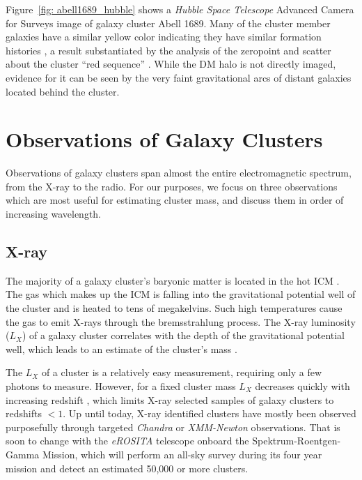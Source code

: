 Figure~\ref{fig: abell1689_hubble} shows a \emph{Hubble Space Telescope} Advanced Camera for Surveys image of galaxy cluster Abell 1689. Many of the cluster member galaxies have a similar yellow color indicating they have similar formation histories , a result substantiated by the analysis of the zeropoint and scatter about the cluster ``red sequence'' . While the DM halo is not directly imaged, evidence for it can be seen by the very faint gravitational arcs of distant galaxies located behind the cluster.

\section{Observations of Galaxy Clusters}
Observations of galaxy clusters span almost the entire electromagnetic spectrum, from the X-ray to the radio. For our purposes, we focus on three observations which are most useful for estimating cluster mass, and discuss them in order of increasing wavelength.

\subsection{X-ray}
The majority of a galaxy cluster's baryonic matter is located in the hot ICM \citep{Voit2005}. The gas which makes up the ICM is falling into the gravitational potential well of the cluster and is heated to tens of megakelvins. Such high temperatures cause the gas to emit X-rays through the bremsstrahlung process. The X-ray luminosity ($L_X$) of a galaxy cluster correlates with the depth of the gravitational potential well, which leads to an estimate of the cluster's mass . 

The $L_X$ of a cluster is a relatively easy measurement, requiring only a few photons to measure. However, for a fixed cluster mass $L_X$ decreases quickly with increasing redshift , which limits X-ray selected samples of galaxy clusters to redshifts $< 1$. Up until today, X-ray identified clusters have mostly been observed purposefully through targeted \textit{Chandra} or \textit{XMM-Newton} observations. That is soon to change with the \textit{eROSITA} \citep{Pillepich2012} telescope onboard the Spektrum-Roentgen-Gamma Mission, which will perform an all-sky survey during its four year mission and detect an estimated 50,000 or more clusters.

